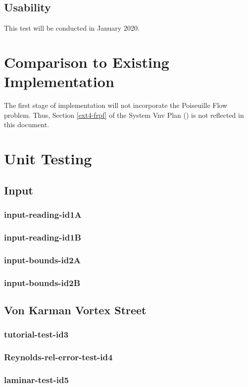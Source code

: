 \documentclass[12pt, titlepage]{article}
\begin{document}
\subsection{Usability}

This test will be conducted in January 2020.
	
\section{Comparison to Existing Implementation}	
The first stage of implementation will not incorporate the Poiseuille Flow problem. Thus, Section \ref{ext4-frpf} of the System Vnv Plan (\citet{LBM_SVNV_PM}) is not reflected in this document.

\section{Unit Testing}
\label{unittesting}

\subsection{Input}
\subsubsection{input-reading-id1A}
\subsubsection{input-reading-id1B}
\subsubsection{input-bounds-id2A}
\subsubsection{input-bounds-id2B}

\subsection{Von Karman Vortex Street}
\subsubsection{tutorial-test-id3}
\subsubsection{Reynolds-rel-error-test-id4}
\subsubsection{laminar-test-id5}
\end{document}
